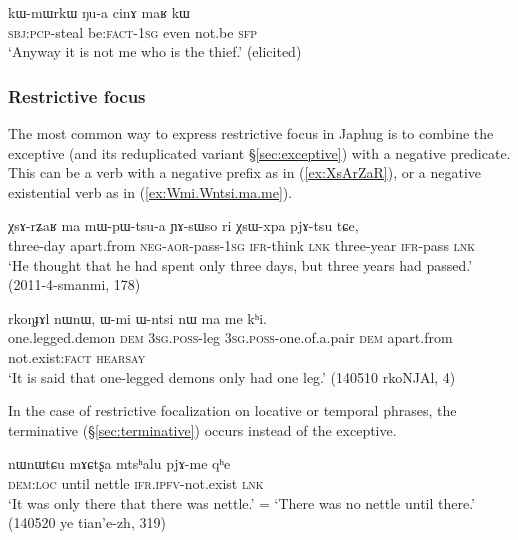  \begin{exe}
\ex \label{ex:Nua.cinA.maR.kW}
\gll  kɯ-mɯrkɯ ŋu-a cinɤ maʁ kɯ  \\
\textsc{sbj}:\textsc{pcp}-steal be:\textsc{fact}-\textsc{1sg} even not.be \textsc{sfp} \\
\glt `Anyway it is not me who is the thief.' (elicited)
\end{exe}

\subsubsection{Restrictive focus} \label{sec:restrictive.focus} 
 The most common way to express restrictive focus in Japhug is to combine the exceptive  (and its reduplicated variant  §\ref{sec:exceptive}) with a negative predicate. This can be a verb with a negative prefix as in (\ref{ex:XsArZaR}), or a negative existential verb as in (\ref{ex:Wmi.Wntsi.ma.me}).
 
 \begin{exe}
\ex  \label{ex:XsArZaR}
\gll   χsɤ-rʑaʁ ma mɯ-pɯ-tsu-a ɲɤ-sɯso ri χsɯ-xpa pjɤ-tsu tɕe,  \\
three-day apart.from \textsc{neg}-\textsc{aor}-pass-\textsc{1sg} \textsc{ifr}-think \textsc{lnk} three-year \textsc{ifr}-pass \textsc{lnk} \\
\glt `He thought that he had spent only three days, but three years had passed.' (2011-4-smanmi, 178)
  \end{exe}
 
  \begin{exe}
\ex  \label{ex:Wmi.Wntsi.ma.me}
\gll  rkoŋɟɤl nɯnɯ, ɯ-mi ɯ-ntsi nɯ ma me kʰi.   \\
one.legged.demon \textsc{dem} \textsc{3sg}.\textsc{poss}-leg \textsc{3sg}.\textsc{poss}-one.of.a.pair \textsc{dem} apart.from not.exist:\textsc{fact} \textsc{hearsay} \\
\glt  `It is said that one-legged demons only had one leg.' (140510 rkoNJAl, 4)
  \end{exe}
  
In the case of restrictive focalization on locative or temporal phrases,   the terminative  (§\ref{sec:terminative}) occurs instead of the exceptive.
  
\begin{exe}
\ex  \label{ex:nWnWtCu.mACtsxa.pjAme}
\gll  nɯnɯtɕu mɤɕtʂa mtsʰalu pjɤ-me qʰe \\
\textsc{dem}:\textsc{loc} until nettle  \textsc{ifr}.\textsc{ipfv}-not.exist \textsc{lnk} \\
\glt `It was only there that there was nettle.' =  `There was no nettle until there.' (140520 ye tian'e-zh, 319)
\end{exe}
    
